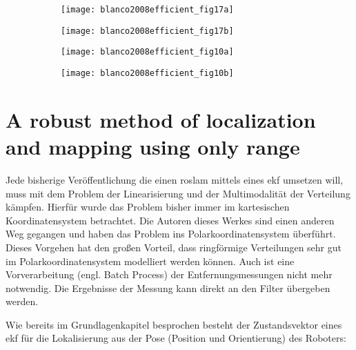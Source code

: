 \begin{figure}
	\begin{subfigure}[t]{0.24\linewidth}
		\texttt{[image: blanco2008efficient\_fig17a]}
		\caption{}
		\label{fig:blanco2008efficient_fig17a}
	\end{subfigure}
	\hfill
	\begin{subfigure}[t]{0.24\linewidth}
		\texttt{[image: blanco2008efficient\_fig17b]}
		\caption{}
		\label{fig:blanco2008efficient_fig17b}
	\end{subfigure}
	\hfill
	\begin{subfigure}[t]{0.24\linewidth}
		\texttt{[image: blanco2008efficient\_fig10a]}
		\caption{}
		\label{fig:blanco2008efficient_fig10a}
	\end{subfigure}
	\hfill
	\begin{subfigure}[t]{0.24\linewidth}
		\texttt{[image: blanco2008efficient\_fig10b]}
		\caption{}
		\label{fig:blanco2008efficient_fig10b}
	\end{subfigure}
	\label{fig:blanco2008efficient}
\end{figure}


%
%
\section{A robust method of localization and mapping using only range}

Jede bisherige Veröffentlichung die einen \Gls{roslam} mittels eines \Gls{ekf} umsetzen will, muss mit dem Problem der Linearisierung und der Multimodalität der Verteilung kämpfen. Hierfür wurde das Problem bisher immer im kartesischen Koordinatensystem betrachtet. Die Autoren dieses Werkes \cite{djugash2009robust} sind einen anderen Weg gegangen und haben das Problem ins Polarkoordinatensystem überführt. Dieses Vorgehen hat den großen Vorteil, dass ringförmige Verteilungen sehr gut im Polarkoordinatensystem modelliert werden können. Auch ist eine Vorverarbeitung (engl. Batch Process) der Entfernungsmessungen nicht mehr notwendig. Die Ergebnisse der Messung kann direkt an den Filter übergeben werden.

Wie bereits im Grundlagenkapitel besprochen besteht der Zustandsvektor eines \Gls{ekf} für die Lokalisierung aus der Pose (Position und Orientierung) des Roboters:

